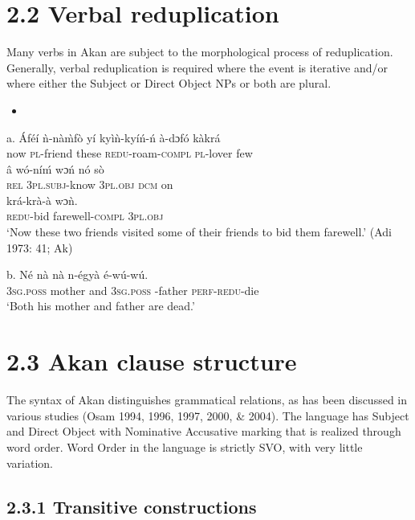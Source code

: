 \documentclass[output=paper]{langsci/langscibook}
\begin{document}
\section{2.2  Verbal reduplication}

Many verbs in Akan are subject to the morphological process of reduplication. Generally, verbal reduplication is required where the event is iterative and/or where either the Subject or Direct Object NPs or both are plural.

\begin{itemize}
\item \end{itemize}
\gll a.  \'{A}f\'{e}\'{i}  \`{n}-n\`{a}\`{m}f\`{o}   y\'{i}   ky\`{i}\`{n}-ky\'{i}\'{n}-\'{n}     \`{a}-dɔf\'{o}     k\`{a}kr\'{a} \\
       now  \textsc{pl}{}-friend  these  \textsc{redu}{}-roam-\textsc{compl}  \textsc{pl}{}-lover  few  \\
\gll   â  w\'{o}-n\'{i}\'{m}     wɔ\'{n}     n\'{o}   s\`{o} \\
       \textsc{rel}  \textsc{3pl.subj}{}-know  \textsc{3pl.obj}  \textsc{dcm}  on\\
\gll   kr\'{a}-kr\`{a}-\`{a}       wɔ\`{n}.\\
       \textsc{redu}{}-bid farewell-\textsc{compl}  \textsc{3pl.obj}\\
\glt   ‘Now these two friends visited some of their friends to bid them farewell.’ (Adi 1973: 41; Ak)
\z

\gll  b.  N\'{e}    n\`{a}    n\`{a}  n-\'{e}gy\`{a}      \'{e}-w\'{u}-w\'{u}.\\
       \textsc{3sg.poss}  mother    and  \textsc{3sg.poss} -father  \textsc{perf-redu}{}-die\\
\glt   ‘Both his mother and father are dead.’ \citep[24]{Martin1936}
\z

\section{2.3  Akan clause structure}

The syntax of Akan distinguishes grammatical relations, as has been discussed in various studies (Osam 1994, 1996, 1997, 2000, \& 2004). The language has Subject and Direct Object with Nominative Accusative marking that is realized through word order. Word Order in the language is strictly SVO, with very little variation.

\subsection{2.3.1  Transitive constructions}
\end{document}

